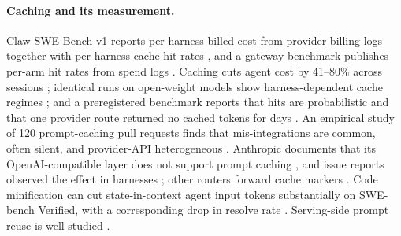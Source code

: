 \documentclass[10pt]{article}
\begin{document}
\paragraph{Caching and its measurement.} Claw-SWE-Bench v1 reports per-harness billed cost from
provider billing logs together with per-harness cache hit rates \citep{zheng2026clawswebench}, and a
gateway benchmark publishes per-arm hit rates from spend logs \citep{litellm2026autorouter}.
Caching cuts agent cost by 41--80\% across sessions \citep{lumer2026dontbreakthecache}; identical
runs on open-weight models show harness-dependent cache regimes \citep{arino2026identicalruns}; and a
preregistered benchmark reports that hits are probabilistic and that one provider route returned no
cached tokens for days \citep{weinberger2026promptwaste}. An empirical study of 120 prompt-caching
pull requests finds that mis-integrations are common, often silent, and provider-API heterogeneous
\citep{zhang2026silentcostly}. Anthropic documents that its OpenAI-compatible layer does not support
prompt caching \citep{anthropic2025openaisdk}, and issue reports observed the effect in harnesses
\citep{cline2026issue13667,nousresearch2026issue84506}; other routers forward cache markers
\citep{openrouter2026promptcaching}. Code minification can cut state-in-context agent input tokens
substantially on SWE-bench Verified, with a corresponding drop in resolve rate
\citep{hrubec2026minification}. Serving-side prompt reuse is well studied
\citep{gim2024promptcache,yao2025cacheblend,jiang2024longllmlingua}.
\end{document}

